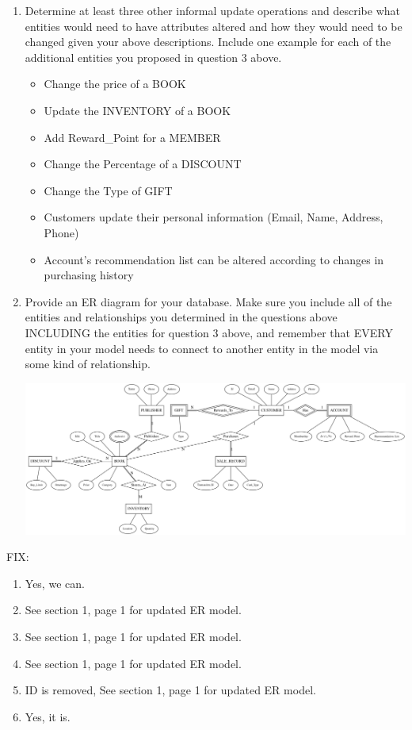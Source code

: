 \documentclass[12pt, letterpaper]{report}
\begin{document}
\begin{enumerate}
\item Determine at least three other informal update operations and describe what entities would need to have attributes altered and how they would need to be changed given your above descriptions.  Include one example for each of the additional entities you proposed in question 3 above.

  \begin{itemize}
    \item Change the price of a BOOK
    \item Update the INVENTORY of a BOOK
    \item Add Reward\_Point for a MEMBER
    \item Change the Percentage of a DISCOUNT
    \item Change the Type of GIFT
    \item Customers update their personal information (Email, Name, Address, Phone)
    \item Account’s recommendation list can be altered according to changes in purchasing history
  \end{itemize}

\item Provide an ER diagram for your database. Make sure you include all of the entities and relationships you determined in the questions above INCLUDING the entities for question 3 above, and remember that EVERY entity in your model needs to connect to another entity in the model via some kind of relationship.

  \includegraphics[width=\linewidth]{Section3/ER1.png}
\end{enumerate}

FIX:
\begin{enumerate}
\item Yes, we can.
\item See section 1, page 1 for updated ER model.
\item See section 1, page 1 for updated ER model.
\item See section 1, page 1 for updated ER model.
\item ID is removed, See section 1, page 1 for updated ER model.
\item Yes, it is.
\end{enumerate}
\end{document}
